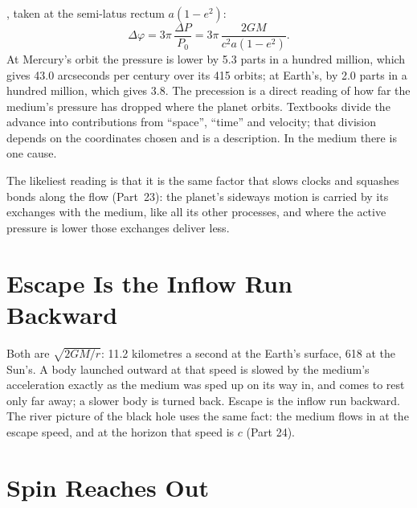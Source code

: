 \documentclass[11pt,a4paper]{article}
\begin{document}
, taken at the semi-latus rectum $a(1-e^2)$:
\begin{equation}
\Delta\varphi = 3\pi\,\frac{\Delta P}{P_0} = 3\pi\,\frac{2GM}{c^2a(1-e^2)}.
\label{eq:precession}
\end{equation}
At Mercury's orbit the pressure is lower by 5.3 parts in a hundred million, which gives 43.0 arcseconds per century over its 415 orbits; at Earth's, by 2.0 parts in a hundred million, which gives 3.8. The precession is a direct reading of how far the medium's pressure has dropped where the planet orbits. Textbooks divide the advance into contributions from ``space'', ``time'' and velocity; that division depends on the coordinates chosen and is a description. In the medium there is one cause.

 The likeliest reading is that it is the same factor that slows clocks and squashes bonds along the flow (Part~23): the planet's sideways motion is carried by its exchanges with the medium, like all its other processes, and where the active pressure is lower those exchanges deliver less.

\section{Escape Is the Inflow Run Backward}
\label{sec:escape}

 Both are $\sqrt{2GM/r}$: 11.2 kilometres a second at the Earth's surface, 618 at the Sun's.  A body launched outward at that speed is slowed by the medium's acceleration exactly as the medium was sped up on its way in, and comes to rest only far away; a slower body is turned back. Escape is the inflow run backward. The river picture of the black hole uses the same fact: the medium flows in at the escape speed, and at the horizon that speed is $c$ (Part 24).

\section{Spin Reaches Out}
\label{sec:spin}
\end{document}
